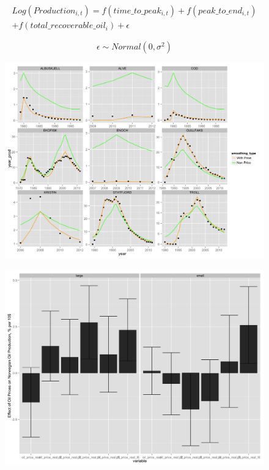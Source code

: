 \documentclass{beamer}
\begin{document}
\begin{frame}[plain]
		\begin{multline}
	\nonumber Log(Production_{i,t})=f(time\_to\_peak_{i,t}) + f(peak\_to\_end_{i,t}) \\
	+ f(total\_recoverable\_oil_i) +  \epsilon
	\end{multline}

		\begin{equation}
		\nonumber \epsilon \sim Normal(0, \sigma^2)
		\end{equation}
\end{frame}
\begin{frame}[plain]
	\begin{figure}
	\includegraphics[width=1\textwidth]{price_vs_non_price.png}
	\end{figure}
\end{frame}

\begin{frame}[plain]
	\begin{figure}
	\includegraphics[width=1\textwidth]{coeff_split_plot.png}
	\end{figure}
\end{frame}
\end{document}
